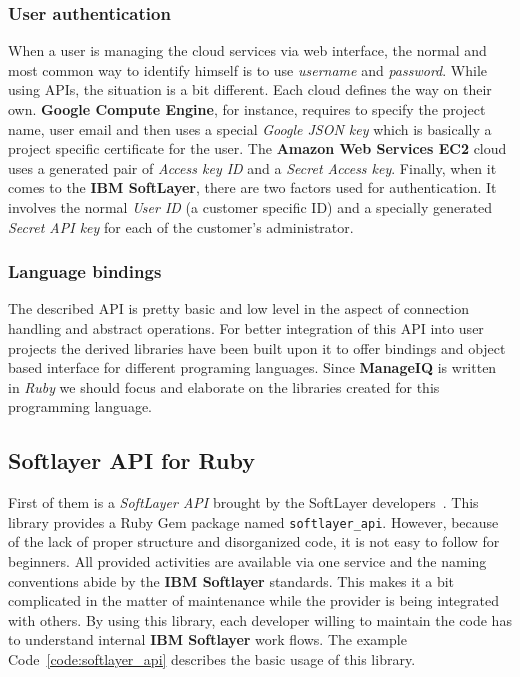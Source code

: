 \subsubsection{User authentication}
\label{subs:User authentication}

When a user is managing the cloud services via web interface, the normal and most common way to identify himself is to use \emph{username} and \emph{password}. While using APIs, the situation is a bit different. Each cloud defines the way on their own. \textbf{Google Compute Engine}, for instance, requires to specify the project name, user email and then uses a special \emph{Google JSON key} which is basically a project specific certificate for the user. The \textbf{Amazon Web Services EC2} cloud uses a generated pair of \emph{Access key ID} and a \emph{Secret Access key}. Finally, when it comes to the \textbf{IBM SoftLayer}, there are two factors used for authentication. It involves the normal \emph{User ID} (a customer specific ID) and a specially generated \emph{Secret API key} for each of the customer's administrator.

\subsubsection{Language bindings}
\label{subs:Language bindings}

The described API is pretty basic and low level in the aspect of connection handling and abstract operations. For better integration of this API into user projects the derived libraries have been built upon it to offer bindings and object based interface for different programing languages. Since \textbf{ManageIQ} is written in \emph{Ruby} we should focus and elaborate on the libraries created for this programming language.

\subsection{Softlayer API for Ruby}
\label{sub:Softlayer-API}

First of them is a \emph{SoftLayer API} brought by the SoftLayer developers~\cite{softlayer_api}. This library provides a Ruby Gem package named \texttt{softlayer\_api}. However, because of the lack of proper structure and disorganized code, it is not easy to follow for beginners. All provided activities are available via one service and the naming conventions abide by the \textbf{IBM Softlayer} standards. This makes it a bit complicated in the matter of maintenance while the provider is being integrated with others. By using this library, each developer willing to maintain the code has to understand internal \textbf{IBM Softlayer} work flows. The example Code~\ref{code:softlayer_api} describes the basic usage of this library.

